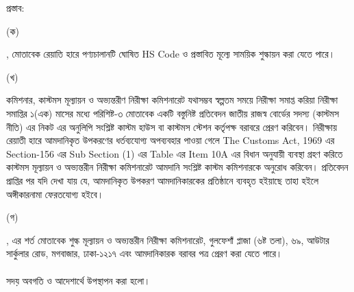 \documentclass[12pt]{article}
\begin{document}
\begin{minipage}[t]{0.05\linewidth}
\hspace{0em}
\end{minipage}
\begin{minipage}[t]{0.95\linewidth}
প্রস্তাব:
\end{minipage}
\begin{minipage}[t]{0.05\linewidth}
\hspace{1em}
\end{minipage}
\begin{minipage}[t]{0.05\linewidth}
(ক)
\end{minipage}
\begin{minipage}[t]{0.90\linewidth}
{\srootz}, {\srootzd} মোতাবেক রেয়াতি হারে
পণ্যচালানটি ঘোষিত HS Code
ও প্রস্তাবিত মূল্যে সাময়িক শুল্কায়ন করা যেতে
পারে।
\\
\end{minipage}
\begin{minipage}[t]{0.05\linewidth}
\hspace{1em}
\end{minipage}
\begin{minipage}[t]{0.05\linewidth}
(খ)
\end{minipage}
\begin{minipage}[t]{0.90\linewidth}
কমিশনার, কাস্টমস মূল্যায়ন ও অভ্যন্তরীণ
নিরীক্ষা কমিশনারেট যথাসম্ভব স্বল্পতম সময়ে
নিরীক্ষা সমাপ্ত করিয়া নিরীক্ষা সমাপ্তির
১(এক) মাসের মধ্যে পরিশিষ্ট-৩ মোতাবেক একটি
বস্তুনিষ্ট প্রতিবেদন জাতীয় রাজস্ব বোর্ডের
সদস্য (কাস্টমস নীতি) এর নিকট এর অনুলিপি সংশ্লিষ্ট
কাস্টম হাউস বা কাস্টমস স্টেশন কর্তৃপক্ষ
বরাবরে প্রেরণ করিবেন।
নিরীক্ষায় রেয়াতী হারে আমদানিকৃত উপকরণের
ধর্তব্যযোগ্য অপব্যবহার পাওয়া গেলে
The Customs Act, 1969 এর Section-156
এর Sub Section (1) এর Table এর Item 10A
এর বিধান অনুযায়ী ব্যবস্থা গ্রহণ করিতে কাস্টমস
মূল্যায়ন ও অভ্যন্তরীন নিরীক্ষা কমিশনারেট আমদানি
সংশ্লিষ্ট কাস্টম কমিশনারকে অনুরোধ করিবেন।
প্রতিবেদন প্রাপ্তির পর যদি দেখা যায় যে, আমদানিকৃত
উপকরণ আমদানিকারকের প্রতিষ্ঠানে ব্যবহৃত হইয়াছে তাহা
হইলে অঙ্গীকারনামা ফেরতযোগ্য হইবে।
\\
\end{minipage}
\begin{minipage}[t]{0.05\linewidth}
\hspace{1em}
\end{minipage}
\begin{minipage}[t]{0.05\linewidth}
(গ)
\end{minipage}
\begin{minipage}[t]{0.90\linewidth}
{\srootz}, {\srootzd} এর শর্ত মোতাবেক
শুল্ক মূল্যায়ন ও অভ্যন্তরীন নিরীক্ষা কমিশনারেট,
গুলফেশাঁ প্লাজা (৬ষ্ট তলা), ৬৯, আউটার
সার্কুলার রোড, মগবাজার, ঢাকা-১২১৭ এবং
আমদানিকারক বরাবর পত্র প্রেরণ করা যেতে পারে।
\\
\\
সদয় অবগতি ও আদেশার্থে উপস্থাপন করা
হলো।
\end{minipage}
\end{document}
